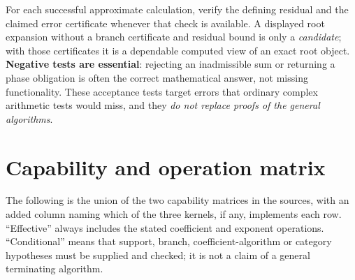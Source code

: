 \documentclass[11pt,letterpaper]{article}
\numberwithin{equation}{section}
\theoremstyle{definition}
\theoremstyle{remark}
\begin{document}
For each successful approximate calculation, verify the defining residual and
the claimed error certificate whenever that check is available. A displayed root
expansion without a branch certificate and residual bound is only a
\emph{candidate}; with those certificates it is a dependable computed view of an
exact root object. \textbf{Negative tests are essential}: rejecting an
inadmissible sum or returning a phase obligation is often the correct
mathematical answer, not missing functionality. These acceptance tests target
errors that ordinary complex arithmetic tests would miss, and they \emph{do not
replace proofs of the general algorithms}.

\section{Capability and operation matrix}
\label{cas:sec-matrix}

The following is the union of the two capability matrices in the sources, with
an added column naming which of the three kernels, if any, implements each row.
``Effective'' always includes the stated coefficient and exponent operations.
``Conditional'' means that support, branch, coefficient-algorithm or category
hypotheses must be supplied and checked; it is not a claim of a general
terminating algorithm.
\end{document}
